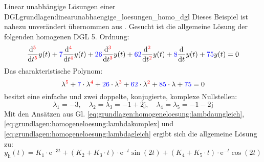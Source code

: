 \begin{frame}
{    \begin{bsp}{Linear unabhängige Lösungen einer DGL}{grundlagen:linearunabhaengige_loesungen_homo_dgl}
        Dieses Beispiel ist nahezu unverändert übernommen aus \cite[S. 241]{albach}. 
        Gesucht ist die allgemeine Lösung der folgenden homogenen DGL 5. Ordnung:
        \begin{equation*}
            \dt[\ecr{5}] y(t) + \ecb{7} \dt[\ecr{4}] y(t) + \ecb{26} \dt[\ecr{3}] y(t) + \ecb{62} \dt[\ecr{2}] y(t) + \ecb{8} \dt y(t) + \ecb{75} y(t) = 0
        \end{equation*}
        Das charakteristische Polynom:
        \begin{equation*}
            \lambda^{\ecr{5}} + \ecb{7} \cdot \lambda^{\ecr{4}} + \ecb{26} \cdot \lambda^{\ecr{3}} + \ecb{62} \cdot \lambda^{\ecr{2}} + \ecb{85} \cdot \lambda + \ecb{75} = 0
        \end{equation*}
        besitzt eine einfache und zwei doppelte, konjugierte, komplexe Nullstellen:
        \begin{equation*}
            \lambda_1 = -3, \quad \lambda_2 = \lambda_3 = -1+\mathrm{2j}, \quad \lambda_4 = \lambda_5 = -1-\mathrm{2j}
        \end{equation*}
        Mit den Ansätzen aus Gl. \ref{eq:grundlagen:homogeneloesung:lambdaungleich}, \ref{eq:grundlagen:homogeneloesung:lambdakomplex} und
        \ref{eq:grundlagen:homogeneloesung:lambdagleich} ergibt sich die allgemeine Lösung zu:
        \begin{equation*}
            y_{\mathrm{h}}(t) = K_1 \cdot \mathrm{e}^{-3 t} + (K_2 + K_3 \cdot t) \cdot \mathrm{e}^{-t} \sin(2t) + (K_4 + K_5 \cdot t) \cdot \mathrm{e}^{-t} \cos(2t)
        \end{equation*}
    \end{bsp}
}%
\end{frame}
